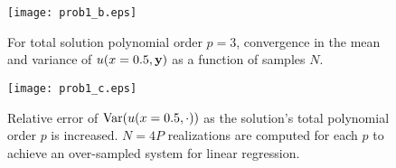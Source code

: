 \documentclass[11pt]{article}
\begin{document}
\begin{figure}[p]
\centering
\texttt{[image: prob1\_b.eps]}
\caption{For total solution polynomial order $p=3$, convergence in the mean and variance of $u(x=0.5,\mb{y})$ as a function of samples $N$.}
\label{fig:1b}
\end{figure}

\begin{figure}[p]
\centering
\texttt{[image: prob1\_c.eps]}
\caption{Relative error of $\operatorname{Var}(u(x=0.5,\cdot))$ as the solution's total polynomial order $p$ is increased. $N=4P$ realizations are computed for each $p$ to achieve an over-sampled system for linear regression.}
\label{fig:1c}
\end{figure}


\end{document}
